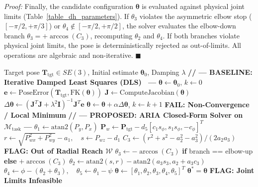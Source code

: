 \documentclass[journal]{IEEEtran}
\newenvironment{proof}{\noindent\textit{Proof: }}{\hfill$\blacksquare$\vspace{1.5mm}}
\begin{document}
\begin{proof}
Finally, the candidate configuration $\boldsymbol{\theta}$ is evaluated against physical joint limits (Table~\ref{table_dh_parameters}). If $\theta_3$ violates the asymmetric elbow stop ($[-\pi/2, +\pi/3]$) or $\theta_4 \notin [-\pi/2, +\pi/2]$, the solver evaluates the elbow-down branch $\theta_3 = +\arccos(C_3)$, recomputing $\theta_2$ and $\theta_4$. If both branches violate physical joint limits, the pose is deterministically rejected as out-of-limits. All operations are algebraic and non-iterative.
\end{proof}

\begin{algorithm}[!t]
\caption{Baseline Iterative Numerical DLS-IK vs. Proposed Closed-Form Analytical IK}
\label{alg_ik_compare}
\begin{algorithmic}[1]
\REQUIRE Target pose $\mathbf{T}_{\text{tgt}} \in SE(3)$, Initial estimate $\boldsymbol{\theta}_0$, Damping $\lambda$
\STATE \textbf{// --- BASELINE: Iterative Damped Least Squares (DLS)~\cite{trac_ik_2015,kdl_2001,ikpy_2020} ---}
\STATE $\boldsymbol{\theta} \leftarrow \boldsymbol{\theta}_0$, $k \leftarrow 0$
    \STATE $\mathbf{e} \leftarrow \text{PoseError}(\mathbf{T}_{\text{tgt}}, \text{FK}(\boldsymbol{\theta}))$
    \STATE $\mathbf{J} \leftarrow \text{ComputeJacobian}(\boldsymbol{\theta})$
    \STATE $\Delta\boldsymbol{\theta} \leftarrow (\mathbf{J}^T\mathbf{J} + \lambda^2\mathbf{I})^{-1}\mathbf{J}^T \mathbf{e}$ 
    \STATE $\boldsymbol{\theta} \leftarrow \boldsymbol{\theta} + \alpha \Delta\boldsymbol{\theta}$, $k \leftarrow k + 1$
\ENDWHILE
{}
    \STATE \textbf{FAIL: Non-Convergence / Local Minimum}
\ENDIF
\STATE \textbf{// --- PROPOSED: ARIA Closed-Form Solver on $\mathcal{M}_{\text{task}}$ ---}
\STATE $\theta_1 \leftarrow \text{atan2}(P_y, P_x)$
\STATE $\mathbf{P}_w \leftarrow \mathbf{P}_{\text{tgt}} - d_5 [c_1 s_\phi, s_1 s_\phi, -c_\phi]^T$
\STATE $r \leftarrow \sqrt{P_{wx}^2 + P_{wy}^2} - a_1, \quad s \leftarrow P_{wz} - d_1$
\STATE $C_3 \leftarrow (r^2 + s^2 - a_2^2 - a_3^2)/(2a_2 a_3)$
    \RETURN \textbf{FLAG: Out of Radial Reach $\mathcal{W}$}
\ENDIF
{}
    \STATE $\theta_3 \leftarrow -\arccos(C_3)$ \textbf{if} branch == elbow-up \textbf{else} $+\arccos(C_3)$
    \STATE $\theta_2 \leftarrow \text{atan2}(s,r) - \text{atan2}(a_3 s_3, a_2 + a_3 c_3)$
    \STATE $\theta_4 \leftarrow \phi - (\theta_2 + \theta_3), \quad \theta_5 \leftarrow \theta_1 - \psi$
    \STATE $\boldsymbol{\theta} \leftarrow [\theta_1, \theta_2, \theta_3, \theta_4, \theta_5]^T$
        \RETURN $\boldsymbol{\theta}^* = \boldsymbol{\theta}$ 
    \ENDIF
\ENDFOR
\RETURN \textbf{FLAG: Joint Limits Infeasible}
\end{algorithmic}
\end{algorithm}
\end{document}
